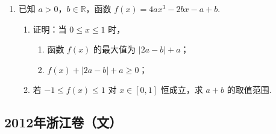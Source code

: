 \begin{description}
\begin{enumerate}[leftmargin=5pt]
        \item 已知 \(a > 0\)，\(b \in \mathbb{R}\)，函数 \(f(x) = 4ax^3 - 2bx - a + b\).
\begin{enumerate}
\item 证明：当 \(0 \leqslant x \leqslant 1\) 时，
\begin{enumerate}
\item 函数 \(f(x)\) 的最大值为 \(|2a-b|+a\)；
\item \(f(x)+|2a-b|+a\geqslant0\)；
\end{enumerate}
\item 若 \(-1 \leqslant f(x) \leqslant 1\) 对 \(x \in [0,1]\) 恒成立，求 \(a+b\) 的取值范围.
\end{enumerate}

    \end{enumerate}

\end{description}


\subsection{2012年浙江卷（文）}\label{gk:2012年浙江卷（文）}

